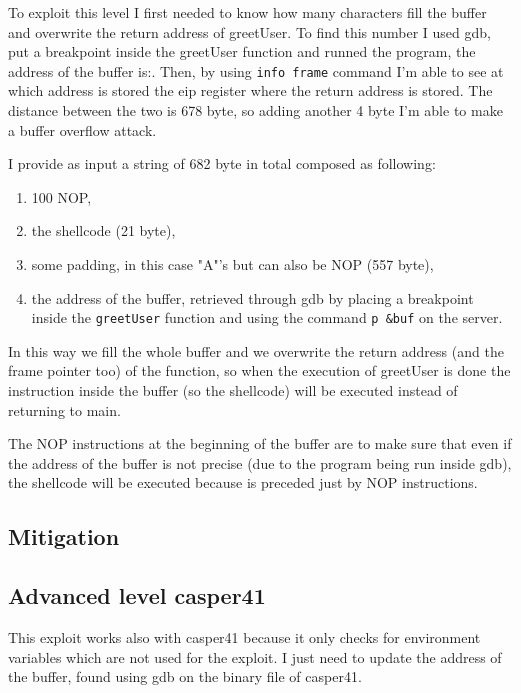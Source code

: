 \documentclass[a4paper,12pt]{article}
\begin{document}
To exploit this level I first needed to know how many characters fill the buffer and overwrite the return address of greetUser. To find this number I used gdb, put a breakpoint inside the greetUser function and runned the program, the address of the buffer is:. Then, by using \texttt{info frame} command I'm able to see at which address is stored the eip register where the return address is stored. The distance between the two is 678 byte, so adding another 4 byte I'm able to make a buffer overflow attack.

I provide as input a string of 682 byte in total composed as following:
\begin{enumerate}
\item 100 NOP,
\item the shellcode (21 byte),
\item some padding, in this case "A"'s but can also be NOP (557 byte),
\item the address of the buffer, retrieved through gdb by placing a breakpoint inside the \texttt{greetUser} function and using the command \texttt{p \&buf} on the server.
\end{enumerate}


In this way we fill the whole buffer and we overwrite the return address (and the frame pointer too) of the function, so when the execution of greetUser is done the instruction inside the buffer (so the shellcode) will be executed instead of returning to main. 

The NOP instructions at the beginning of the buffer are to make sure that even if the address of the buffer is not precise (due to the program being run inside gdb), the shellcode will be executed because is preceded just by NOP instructions.


\subsection{Mitigation}

\subsection{Advanced level casper41}

This exploit works also with casper41 because it only checks for environment variables which are not used for the exploit. I just need to update the address of the buffer, found using gdb on the binary file of casper41.
\end{document}
